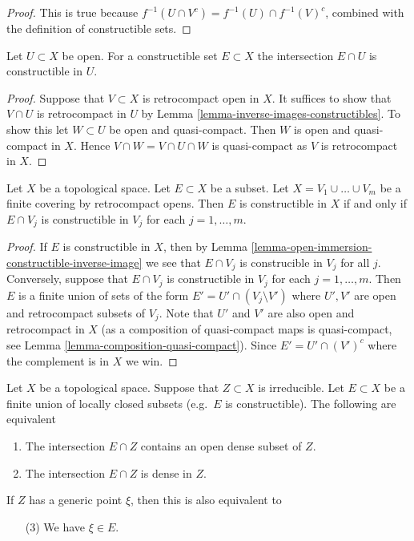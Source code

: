 \begin{proof}
This is true because $f^{-1}(U \cap V^c) = f^{-1}(U) \cap f^{-1}(V)^c$,
combined with the definition of constructible sets.
\end{proof}

\begin{lemma}
\label{lemma-open-immersion-constructible-inverse-image}
Let $U \subset X$ be open. For a constructible set
$E \subset X$ the intersection $E \cap U$ is constructible
in $U$.
\end{lemma}

\begin{proof}
Suppose that $V \subset X$ is retrocompact open in $X$.
It suffices to show that $V \cap U$ is retrocompact in $U$
by Lemma \ref{lemma-inverse-images-constructibles}. To show this
let $W \subset U$ be open and quasi-compact. Then $W$
is open and quasi-compact in $X$. Hence $V \cap W = V \cap U \cap W$
is quasi-compact as $V$ is retrocompact in $X$.
\end{proof}

\begin{lemma}
\label{lemma-collate-construcible}
Let $X$ be a topological space. Let $E \subset X$ be a subset.
Let $X = V_1 \cup \ldots \cup V_m$ be a finite covering by
retrocompact opens.
Then $E$ is constructible in $X$ if and only if $E \cap V_j$
is constructible in $V_j$ for each $j = 1, \ldots, m$.
\end{lemma}

\begin{proof}
If $E$ is constructible in $X$, then by
Lemma \ref{lemma-open-immersion-constructible-inverse-image}
we see that $E \cap V_j$ is construcible in $V_j$ for all $j$.
Conversely, suppose that $E \cap V_j$
is constructible in $V_j$ for each $j = 1, \ldots, m$.
Then $E$ is a finite union of sets of the form
$E' = U' \cap (V_j \setminus V')$ where $U', V'$ are
open and retrocompact subsets of $V_j$. Note that $U'$ and $V'$ are also
open and retrocompact in $X$ (as a composition of quasi-compact
maps is quasi-compact, see
Lemma \ref{lemma-composition-quasi-compact}).
Since $E' = U' \cap (V')^c$ where the complement is in $X$ we win.
\end{proof}

\begin{lemma}
\label{lemma-generic-point-in-constructible}
Let $X$ be a topological space. Suppose that
$Z \subset X$ is irreducible. Let $E \subset X$
be a finite union of locally closed subsets (e.g.\ $E$
is constructible). The following are equivalent
\begin{enumerate}
\item The intersection $E \cap Z$ contains an open
dense subset of $Z$.
\item The intersection $E \cap Z$ is dense in $Z$.
\end{enumerate}
If $Z$ has a generic point $\xi$, then this is
also equivalent to
\begin{enumerate}
\item[(3)] We have $\xi \in E$.
\end{enumerate}
\end{lemma}

